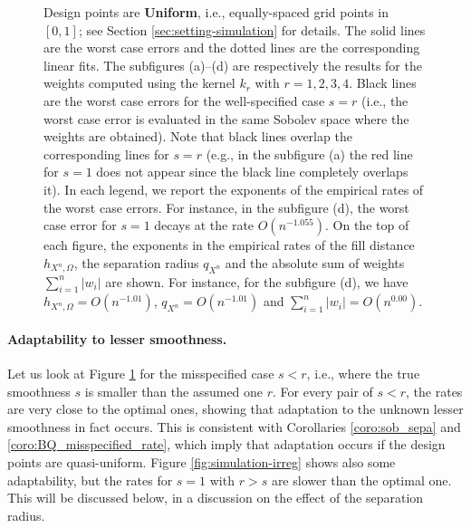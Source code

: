 \documentclass[11pt]{article}
\theoremstyle{remark}
\theoremstyle{example}
\theoremstyle{remark}
\begin{document}
\begin{figure}[th]
 \begin{center}
 \end{center}
\vspace{-4mm}
 \caption{
 Design points are \textbf{Uniform}, i.e., equally-spaced grid points in $[0,1]$; see Section \ref{sec:setting-simulation} for details.
 The solid lines are the worst case errors and the dotted lines are the corresponding linear fits.
 The subfigures (a)--(d) are respectively the results for the weights computed using the kernel $k_r$ with $r = 1, 2, 3, 4$.
 Black lines are the worst case errors for the well-specified case $s= r$ (i.e., the worst case error is evaluated in the same Sobolev space where the weights are obtained).
   Note that black lines overlap the corresponding lines for $s = r$ (e.g., in the subfigure (a) the red line for $s=1$ does not appear since the black line completely overlaps it).
 In each legend, we report the exponents of the empirical rates of the worst case errors.
 For instance, in the subfigure (d), the worst case error for $s = 1$ decays at the rate $O(n^{-1.055})$. 
 On the top of each figure, the exponents in the empirical rates of the fill distance $h_{X^n,\Omega}$, the separation radius $q_{X^n}$ and the absolute sum of weights $\sum_{i=1}^n |w_i|$ are shown. For instance, for the subfigure (d), we have $h_{X^n,\Omega} = O(n^{-1.01})$, $q_{X^n} = O(n^{-1.01})$ and $\sum_{i=1}^n |w_i| = O(n^{0.00})$. 
 }
 \label{fig:simulation-equi}
\end{figure}
\vspace{-4mm}
\paragraph{Adaptability to lesser smoothness.}
Let us look at Figure \ref{fig:simulation-equi} for the misspecified case $s < r$, i.e., where the true smoothness $s$ is smaller than the assumed one $r$.
For every pair of $s < r$, the rates are very close to the optimal ones, showing that adaptation to the unknown lesser smoothness in fact occurs.
This is consistent with Corollaries \ref{coro:sob_sepa} and \ref{coro:BQ_misspecified_rate}, which imply that adaptation occurs if the design points are quasi-uniform.
Figure \ref{fig:simulation-irreg} shows also some adaptability, but the rates for $s = 1$ with $r > s$ are slower than the optimal one. 
This will be discussed below, in a discussion on the effect of the separation radius.
\end{document}
